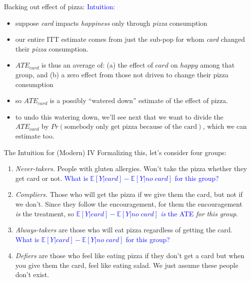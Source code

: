 \documentclass[xcolor=dvipsnames]{beamer}
\newcommand\E{\mathbb{E}}
\begin{document}
\begin{frame}{Backing out effect of pizza:}
  \textcolor{Blue}{Intuition}: 
 \footnotesize
 \begin{itemize}
 \item<2-> suppose \textit{card} impacts \textit{happiness} only through \textit{pizza} consumption
 \smallskip
 \item<3-> our entire ITT estimate comes from just the sub-pop for whom \textit{card} changed their \textit{pizza} consumption.
\smallskip 
 \item<4-> $ATE_{card}$ is thus an average of: (a) the effect of $card$ on $happy$ among that group, and (b) a zero effect from those not driven to change their pizza consumption 
\smallskip  
  \item<5-> so $ATE_{card}$ is a possibly ``watered down'' estimate of the effect of pizza. 
 \smallskip
\item<6-> to undo this watering down, we'll see next that we want to divide the $ATE_{card}$ by $Pr(\text{somebody only get pizza because of the card})$, which we can estimate too.
 \end{itemize}
\end{frame}

\begin{frame}{The Intuition for (Modern) IV}
 Formalizing this, let's consider four groups:
\begin{enumerate}
\footnotesize
\item<2-> \textit{Never-takers.} People with gluten allergies. Won't take the pizza whether they get card or not. \textcolor{Blue}{What is $\E[Y|card]-\E[Y|no\;card]$ for this group?}
\smallskip
\item<3-> \textit{Compliers.} Those who will get the pizza if we give them the card, but not if we don't. Since they follow the encouragement, for them the encouragement \textit{is} the treatment, so \textcolor{Blue}{$\E[Y|card]-\E[Y|no\;card]$ \textit{is} the ATE} \textit{for this group}.
\smallskip
\item<4->  \textit{Always-takers} are those who will eat pizza regardless of getting the card. 
\textcolor{Blue}{What is $\E[Y|card]-\E[Y|no\;card]$ for this group?}
\smallskip
\item<5-> \textit{Defiers} are those who feel like eating pizza if they don't get a card but when you give them the card, feel like eating salad.  We just assume these people don't exist. 
\end{enumerate}
\end{frame}
\end{document}
